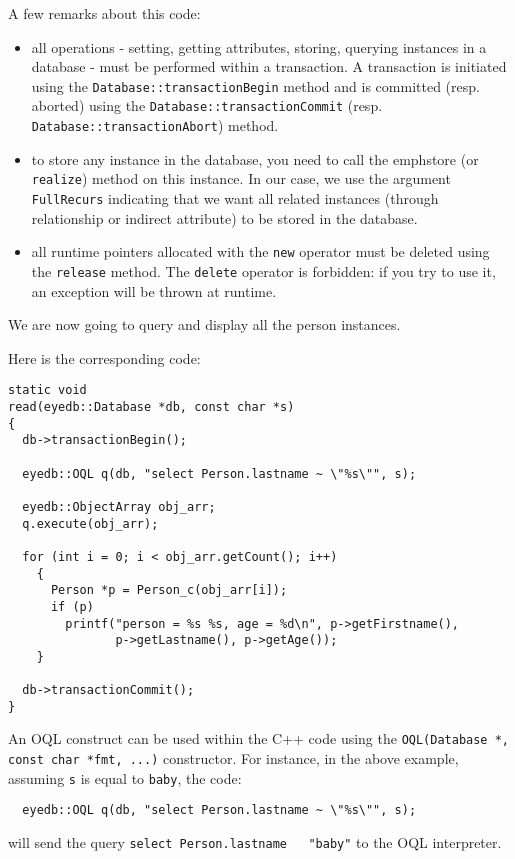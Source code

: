 A few remarks about this code:
\begin{itemize}
\item all operations - setting, getting attributes, storing, querying instances
in a database - must be performed within a transaction.
A transaction is initiated using the \texttt{Database::transactionBegin}
method and is committed (resp. aborted) using the
\texttt{Database::transactionCommit}
(resp. \texttt{Database::transactionAbort}) method.
\item to store any instance in the database, you need to call the 
emph{store} (or \texttt{realize}) method on this instance.
In our case, we use the argument \texttt{FullRecurs} indicating that
we want all related instances (through relationship or indirect
attribute) to be stored in the database.
\item all runtime pointers allocated with the \texttt{new} operator must
be deleted using the \texttt{release} method. The \texttt{delete} operator
is forbidden: if you try to use it, an exception will be thrown at
runtime.
\end{itemize}

We are now going to query and display all the person instances.

Here is the corresponding code:
\verbsize \begin{verbatim}
static void
read(eyedb::Database *db, const char *s)
{
  db->transactionBegin();

  eyedb::OQL q(db, "select Person.lastname ~ \"%

  eyedb::ObjectArray obj_arr;
  q.execute(obj_arr);

  for (int i = 0; i < obj_arr.getCount(); i++)
    {
      Person *p = Person_c(obj_arr[i]);
      if (p)
        printf("person = %
               p->getLastname(), p->getAge());
    }

  db->transactionCommit();
}
\end{verbatim}
\normalsize

An OQL construct can be used within the C++ code using the
\texttt{OQL(Database *, const char *fmt, ...)} constructor.
For instance, in the above example, assuming \texttt{s} is equal to \texttt{baby}, the code:
\verbsize \begin{verbatim}
  eyedb::OQL q(db, "select Person.lastname ~ \"%
\end{verbatim}
\normalsize
will send the query \texttt{select Person.lastname ~ "baby"} to the OQL interpreter.

